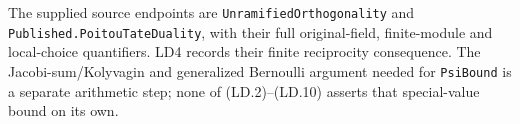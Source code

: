 The supplied source endpoints are \texttt{UnramifiedOrthogonality}
and \texttt{Published.PoitouTateDuality}, with their full original-field,
finite-module and local-choice quantifiers.  LD4 records their finite
reciprocity consequence.  The Jacobi-sum/Kolyvagin and generalized
Bernoulli argument needed for \texttt{PsiBound} is a separate
arithmetic step; none of (LD.2)--(LD.10) asserts that special-value
bound on its own.
